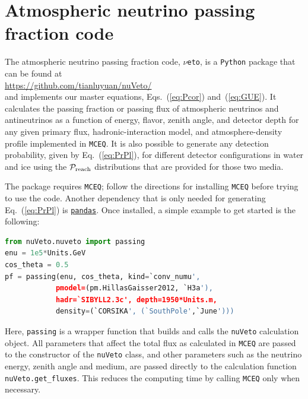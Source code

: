 \documentclass[aps,prd,showpacs,letterpaper,onecolumn,longbibliography,superscriptaddress,notitlepage,nofootinbib]{revtex4-1}%
\newcommand{\Prob}{{\cal P}}
\newcommand{\MCEq}{\texttt{MCE{\scriptsize Q}}}
\newcommand{\Python}{\texttt{Python}}
\newcommand{\nuveto}{{\LARGE $\nu$}\texttt{eto}}
\begin{document}
\section{Atmospheric neutrino passing fraction code}
\label{app:code}

The atmospheric neutrino passing fraction code, \nuveto, is a \Python{} package that can be found at \\

\noindent \url{https://github.com/tianluyuan/nuVeto/} \\

\noindent and implements our master equations, Eqs.~(\ref{eq:Pcor}) and~(\ref{eq:GUE}). It calculates the passing fraction or passing flux of atmospheric neutrinos and antineutrinos as a function of energy, flavor, zenith angle, and detector depth for any given primary flux, hadronic-interaction model, and atmosphere-density profile implemented in \MCEq. It is also possible to generate any detection probability, given by Eq.~(\ref{eq:PrPl}), for different detector configurations in water and ice using the $\Prob_{\rm reach}$ distributions that are provided for those two media.

The package requires \MCEq; follow the directions for installing \MCEq{} before trying to use the code. Another dependency that is only needed for generating Eq.~(\ref{eq:PrPl}) is \href{https://pandas.pydata.org/}{\texttt{pandas}}. Once installed, a simple example to get started is the following:
%
\begin{lstlisting}[language=Python]
from nuVeto.nuveto import passing
enu = 1e5*Units.GeV
cos_theta = 0.5
pf = passing(enu, cos_theta, kind=`conv_numu',
            pmodel=(pm.HillasGaisser2012, `H3a'),
            hadr=`SIBYLL2.3c', depth=1950*Units.m,
            density=(`CORSIKA', (`SouthPole',`June')))
\end{lstlisting}
%
Here, \lstinline|passing| is a wrapper function that builds and calls the \lstinline|nuVeto| calculation object. All parameters that affect the total flux as calculated in \MCEq{} are passed to the constructor of the \lstinline|nuVeto| class, and other parameters such as the neutrino energy, zenith angle and medium, are passed directly to the calculation function \lstinline|nuVeto.get_fluxes|. This reduces the computing time by calling \MCEq{} only when necessary.
\end{document}
